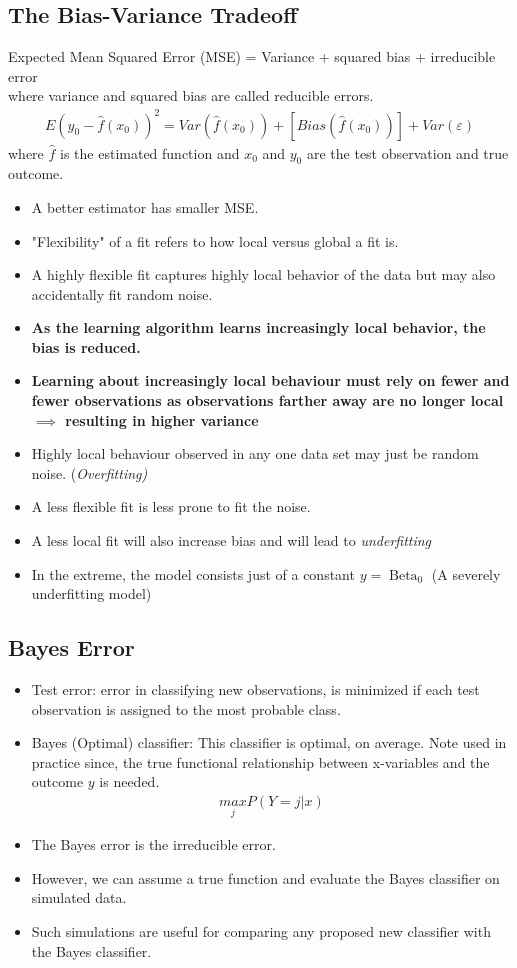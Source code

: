 \documentclass[12pt, oneside]{article}
\newcommand*{\Beta}{\operatorname{Beta}}
\newcommand*{\eps}{\varepsilon}
\begin{document}
\subsection{The Bias-Variance Tradeoff}
Expected Mean Squared Error (MSE) = Variance + squared bias + irreducible error \\
where variance and squared bias are called reducible errors.
\begin{align*}
    E(y_0-\widehat{f}(x_0))^2 = Var(\widehat{f}(x_0)) + [Bias(\widehat{f}(x_0))] + Var(\eps)
\end{align*}
where $\widehat{f}$ is the estimated function and $x_0$ and $y_0$ are the test observation and true outcome.
\begin{itemize}
    \item A better estimator has smaller MSE.
    \item "Flexibility" of a fit refers to how local versus global a fit is.
    \item A highly flexible fit captures highly local behavior of the data but may also accidentally fit random noise.
    \item \textbf{As the learning algorithm learns increasingly local behavior, the bias is reduced.}
    \item \textbf{Learning about increasingly local behaviour must rely on fewer and fewer observations as observations farther away are no longer local $\implies$ resulting in higher variance}
    \item Highly local behaviour observed in any one data set may just be random noise. (\emph{Overfitting)}
    \item A less flexible fit is less prone to fit the noise. 
    \item A less local fit will also increase bias and will lead to \emph{underfitting}
    \item In the extreme, the model consists just of a constant $y=\Beta_0$ (A severely underfitting model)
\end{itemize}

\subsection{Bayes Error}
\begin{itemize}
    \item Test error: error in classifying new observations, is minimized if each test observation is assigned to the most probable class. 
    \item Bayes (Optimal) classifier: This classifier is optimal, on average. Note used in practice since, the true functional relationship between x-variables and the outcome $y$ is needed.
    \begin{align*}
        \underset{j}{max}P(Y=j|x)
    \end{align*}
    \item The Bayes error is the irreducible error. 
    \item However, we can assume a true function and evaluate the Bayes classifier on simulated data.
    \item Such simulations are useful for comparing any proposed new classifier with the Bayes classifier.
\end{itemize}
\end{document}
